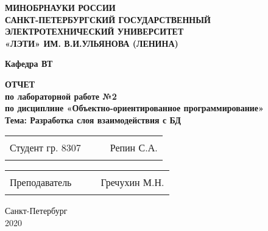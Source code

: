 \begin{titlepage}
\begin{center}
    \uppercase{\textbf{Минобрнауки России\\
            Санкт-Петербургский государственный\\
            электротехнический университет\\
            «ЛЭТИ» им. В.И.Ульянова (Ленина)
    }}
    \vspace{0.25cm}

    \textbf{Кафедра ВТ}
    \vfill

    \uppercase{\textbf{\large{
        Отчет
    }}}
    \\
    \textbf{\large{
      по лабораторной работе №2\\
      по дисциплине «Объектно-ориентированное программирование»\\
      Тема: Разработка слоя взаимодействия с БД\\
      \vspace{0.5cm}
    }}
  \bigskip
\end{center}
\vfill

\begin{tabularx}{\textwidth}{@{}lcXr}
    Студент гр. 8307 & \hspace{1.6cm} & \rule{5cm}{1pt} & Репин С.А.
\end{tabularx}

\vspace{0.5cm}

\noindent
\begin{tabularx}{\textwidth}{@{}lcXr}
    Преподаватель & \hspace{2cm} & \rule{5cm}{1pt} & Гречухин М.Н.
\end{tabularx}

\hfill \break
\hfill \break

\begin{center}
  Санкт-Петербург\\2020
\end{center}

\end{titlepage}

